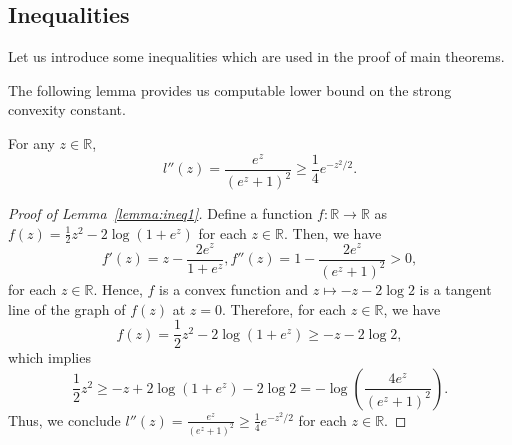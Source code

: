 \subsection{Inequalities}
Let us introduce some inequalities which are used in the proof of main theorems.

The following lemma provides us computable lower bound on the strong convexity constant.
\begin{lemma} \label{lemma:ineq1}
For any $z \in \mathbb{R}$,
\begin{equation*}
    l''(z) = \frac{e^z}{(e^z+1)^2} \geq \frac{1}{4} e^{-z^2/2}.
\end{equation*}
\end{lemma}
\begin{proof}[Proof of Lemma~\ref{lemma:ineq1}]
Define a function $f: \mathbb{R} \rightarrow \mathbb{R}$ as $f(z) = \frac{1}{2} z^2 - 2\log(1+e^z)$ for each $z \in \mathbb{R}$. Then, we have
\begin{equation*}
f'(z) = z - \frac{2 e^z}{1+e^z}, f''(z) = 1- \frac{2e^z}{(e^z+1)^2} > 0,
\end{equation*}
for each $z \in \mathbb{R}$. Hence, $f$ is a convex function and $z \mapsto -z - 2 \log 2$ is a tangent line of the graph of $f(z)$ at $z=0$. Therefore, for each $z \in \mathbb{R}$, we have
\begin{equation*}
     f(z) = \frac{1}{2}z^2 - 2 \log (1+e^z) \geq -z - 2\log 2,
\end{equation*}
which implies 
\begin{equation*}
    \frac{1}{2}z^2 \geq -z +2\log(1+e^z)-2\log 2 = -\log \left(  \frac{4e^z}{(e^z+1)^2}\right) .
\end{equation*}
Thus, we conclude $l''(z) = \frac{e^z}{(e^z+1)^2} \geq \frac{1}{4} e^{-z^2/2}$ for each $z \in \mathbb{R}$.
\end{proof}

